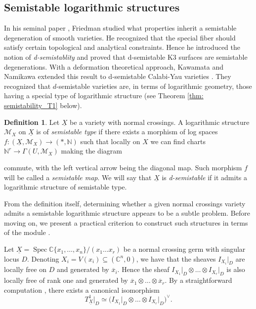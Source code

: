 \documentclass[reqno]{amsart}
\newcommand\C{\mathbb{C}}
\newcommand\N{\mathbb{N}}
\newcommand{\OO}{\mathcal{O}}
\DeclareMathOperator{\Spec}{Spec}
\newcommand{\M}{\mathcal{M}}
\DeclareMathOperator{\Ext}{Ext}
\newcounter{Theorem}
\theoremstyle{definition}
\newtheorem{definition}[theorem]{Definition}
\theoremstyle{named}
\begin{document}
\subsection{Semistable logarithmic structures} In his seminal paper \cite{friedman1983global}, Friedman studied what properties inherit a semistable degeneration of smooth varieties. He recognized that the special fiber should satisfy certain topological and analytical constraints. Hence he introduced the notion of \textit{d-semistablity} and proved that d-semistable K3 surfaces are semistable degenerations. With a deformation theoretical approach, Kawamata and Namikawa extended this result to d-semistable Calabi-Yau varieties \cite{kawamata1994logarithmic}. They recognized that $d$-semistable varieties are, in terms of logarithmic geometry, those having a special type of logarithmic structure (see Theorem \ref{thm: semistability_T1}
 below).

\begin{definition}\label{def: semistable str}
Let $\underline{X}$ be a variety with normal crossings. A logarithmic structure $\M_X$ on $\underline{X}$ is of \textit{semistable type} if there exists a morphism of log spaces $f:(\underline{X},\M_X)\rightarrow (\ast,\N)$ such that locally on $X$ we can find charts $\N^r\rightarrow \Gamma(U,\M_X)$ making the diagram
\begin{center}
\end{center}
\end{definition}
commute, with the left vertical arrow being the diagonal map. Such morphism $f$ will be called a \textit{semistable map}. We will say that $\underline{X}$ is \textit{d-semistable} if it admits a logarithmic structure of semistable type.

From the definition itself, determining whether a given normal crossings variety admits a semistable logarithmic structure appears to be a subtle problem. Before moving on, we present a practical criterion to construct such structures in terms of the module \smash{$T^1_{\underline{X}} = \Ext^1(\Omega^1_{\underline{X}},\OO_{\underline{X}})$}. 

Let $\underline{X}=\Spec\C\{x_1,\dots,x_n\}/(x_1\dots x_r)$ be a normal 
crossing germ with singular locus $D$. Denoting $X_i=V(x_i)\subseteq (\C^n,0)$, we have that  the sheaves $I_{X_i}\vert_D$ are locally free on $D$ and generated by $\overline{x}_i$. Hence the sheaf 
$I_{X_1}\vert_D\otimes\dots\otimes I_{X_r}\vert_D$
is also locally free of rank one and generated by $\overline{x}_1\otimes \dots\otimes\overline{x}_r$. By a straightforward  computation \cite[Prop. 2.3]{friedman1983global}, there exists a canonical isomorphism $$T^1_{\underline{X}}\big\vert_D\simeq\big(I_{X_1}\vert_D\otimes\dots\otimes I_{X_r}\vert_D\big)^\vee.$$
\end{document}
